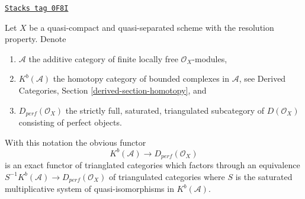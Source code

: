 \begin{proposition}
\label{perfect-proposition-perfect-resolution-property}
\href{https://stacks.math.columbia.edu/tag/0F8I}{\texttt{Stacks tag 0F8I}}

Let $X$ be a quasi-compact and quasi-separated scheme with the
resolution property. Denote
\begin{enumerate}
\item $\mathcal{A}$ the additive category of finite locally free
$\mathcal{O}_X$-modules,
\item $K^b(\mathcal{A})$ the homotopy category of bounded complexes
in $\mathcal{A}$, see
Derived Categories, Section \ref{derived-section-homotopy}, and
\item $D_{perf}(\mathcal{O}_X)$ the strictly full, saturated,
triangulated subcategory of $D(\mathcal{O}_X)$ consisting of
perfect objects.
\end{enumerate}
With this notation the obvious functor
$$
K^b(\mathcal{A}) \longrightarrow D_{perf}(\mathcal{O}_X)
$$
is an exact functor of trianglated categories which factors through an
equivalence $S^{-1}K^b(\mathcal{A}) \to D_{perf}(\mathcal{O}_X)$
of triangulated categories
where $S$ is the saturated multiplicative system of quasi-isomorphisms
in $K^b(\mathcal{A})$.
\end{proposition}

